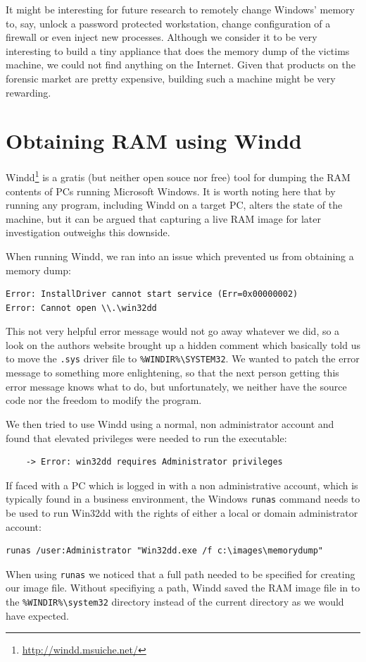 \documentclass[a4paper,
    11pt,
    normalheadings,
    parindent,
    UKenglish,
    abstracton,
    ]{scrartcl}
\begin{document}
It might be interesting for future research to remotely change Windows' memory to, say, unlock a password protected workstation, change configuration of a firewall or even inject new processes.
Although we consider it to be very interesting to build a tiny appliance that does the memory dump of the victims machine, we could not find anything on the Internet.
Given that products on the forensic market are pretty expensive, building such a machine might be very rewarding.


\section{Obtaining RAM using Windd}
Windd\footnote{\url{http://windd.msuiche.net/}} is a gratis (but neither open souce nor free) tool for dumping the RAM contents of PCs running Microsoft Windows. It is worth noting here that by running any program, including Windd on a target PC, alters the state of the machine, but it can be argued that capturing a live RAM image for later investigation outweighs this downside.


When running Windd, we ran into an issue which prevented us from obtaining a memory dump:
\begin{verbatim}
Error: InstallDriver cannot start service (Err=0x00000002)
Error: Cannot open \\.\win32dd
\end{verbatim}
This not very helpful error message would not go away whatever we did, so a look on the authors website brought up a hidden comment which basically told us to move the \texttt{.sys} driver file to \texttt{\%WINDIR\%\textbackslash{}SYSTEM32}.
We wanted to patch the error message to something more enlightening, so that the next person getting this error message knows what to do, but unfortunately, we neither have the source code nor the freedom to modify the program.

We then tried to use Windd using a normal, non administrator account and found that elevated privileges were needed to run the executable:
\begin{verbatim}
    -> Error: win32dd requires Administrator privileges
\end{verbatim}
If faced with a PC which is logged in with a non administrative account, which is typically found in a business environment, the Windows \texttt{runas} command needs to  be used to run Win32dd with the rights of either a local or domain administrator account:
\begin{verbatim}
runas /user:Administrator "Win32dd.exe /f c:\images\memorydump"
\end{verbatim}
When using \texttt{runas} we noticed that a full path needed to be specified for creating our image file.
Without specifiying a path, Windd saved the RAM image file in to the \texttt{\%WINDIR\%\textbackslash{}system32} directory instead of the current directory as we would have expected.
\end{document}
